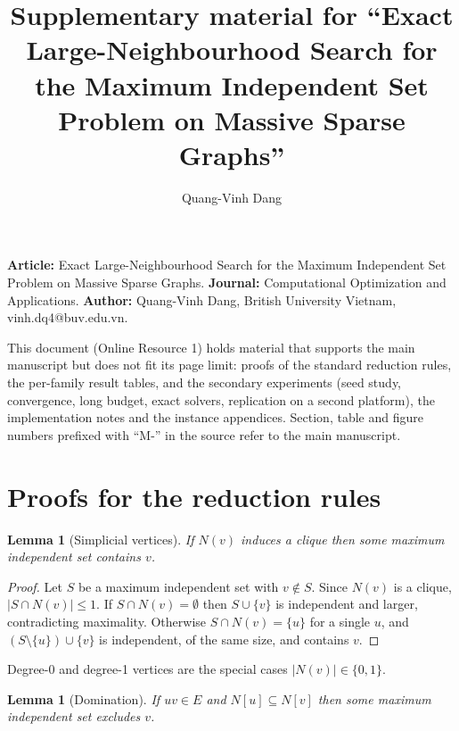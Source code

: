 \documentclass[preprint,authoryear,11pt]{elsarticle}
\newtheorem{lemma}[theorem]{Lemma}
\theoremstyle{definition}
\begin{document}
\begin{frontmatter}
\title{Supplementary material for ``Exact Large-Neighbourhood Search for the
Maximum Independent Set Problem on Massive Sparse Graphs''}
\author{Quang-Vinh Dang}
\address{British University Vietnam, Hung Yen, Vietnam. Corresponding author: vinh.dq4@buv.edu.vn}
\end{frontmatter}

\noindent\textbf{Article:} Exact Large-Neighbourhood Search for the Maximum Independent Set Problem on Massive Sparse Graphs.
\textbf{Journal:} Computational Optimization and Applications.
\textbf{Author:} Quang-Vinh Dang, British University Vietnam, vinh.dq4@buv.edu.vn.
\par\medskip

This document (Online Resource 1) holds material that supports the main manuscript but does not fit
its page limit: proofs of the standard reduction rules, the per-family result
tables, and the secondary experiments (seed study, convergence, long budget,
exact solvers, replication on a second platform), the implementation notes and the
instance appendices. Section, table and figure numbers prefixed with ``M-'' in the
source refer to the main manuscript.

\section{Proofs for the reduction rules}
\begin{lemma}[Simplicial vertices]
\label{lem:simplicial}
If $N(v)$ induces a clique then some maximum independent set contains $v$.
\end{lemma}

\begin{proof}
Let $S$ be a maximum independent set with $v \notin S$. Since $N(v)$ is a
clique, $|S \cap N(v)| \le 1$. If $S \cap N(v) = \emptyset$ then $S \cup \{v\}$
is independent and larger, contradicting maximality. Otherwise
$S \cap N(v) = \{u\}$ for a single $u$, and $(S \setminus \{u\}) \cup \{v\}$ is
independent, of the same size, and contains $v$.
\end{proof}

Degree-0 and degree-1 vertices are the special cases $|N(v)| \in \{0,1\}$.

\begin{lemma}[Domination]
\label{lem:domination}
If $uv \in E$ and $N[u] \subseteq N[v]$ then some maximum independent set
excludes $v$.
\end{lemma}
\end{document}
